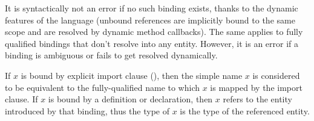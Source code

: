 It is syntactically not an error if no such binding exists, thanks to the dynamic features of the language (unbound references are implicitly bound to the same scope and are resolved by dynamic method callbacks). The same applies to fully qualified bindings that don't resolve into any entity. However, it is an error if a binding is ambiguous or fails to get resolved dynamically.

If $x$ is bound by explicit \lstinline@use@ import clause (), then the simple name $x$ is considered to be equivalent to the fully-qualified name to which $x$ is mapped by the import clause. If $x$ is bound by a definition or declaration, then $x$ refers to the entity introduced by that binding, thus the type of $x$ is the type of the referenced entity. 






